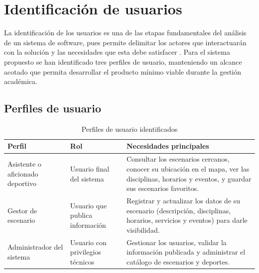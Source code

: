 
\section{Identificaci\'on de usuarios}

La identificaci\'on de los usuarios es una de las etapas fundamentales del
an\'alisis de un sistema de software, pues permite delimitar los actores que
interactuar\'an con la soluci\'on y las necesidades que esta debe satisfacer
\citep{sommerville2011, kendall2011}. Para el sistema propuesto se han
identificado tres perfiles de usuario, manteniendo un alcance acotado que
permita desarrollar el producto m\'inimo viable durante la gesti\'on acad\'emica.

\subsection{Perfiles de usuario}

\begin{table}[H]
  \centering
  \caption{Perfiles de usuario identificados}
  \begin{tablaAPA}
    \begin{tabular}{@{}p{3.2cm}p{3.4cm}p{8.6cm}@{}}
      \toprule
      \textbf{Perfil} & \textbf{Rol} & \textbf{Necesidades principales} \\
      \midrule
      Asistente o aficionado deportivo & Usuario final del sistema &
      Consultar los escenarios cercanos, conocer su ubicaci\'on en el mapa, ver
      las disciplinas, horarios y eventos, y guardar sus escenarios favoritos. \\
      \addlinespace
      Gestor de escenario & Usuario que publica informaci\'on &
      Registrar y actualizar los datos de su escenario (descripci\'on,
      disciplinas, horarios, servicios y eventos) para darle visibilidad. \\
      \addlinespace
      Administrador del sistema & Usuario con privilegios t\'ecnicos &
      Gestionar los usuarios, validar la informaci\'on publicada y administrar
      el cat\'alogo de escenarios y deportes. \\
      \bottomrule
    \end{tabular}
  \end{tablaAPA}
\end{table}
